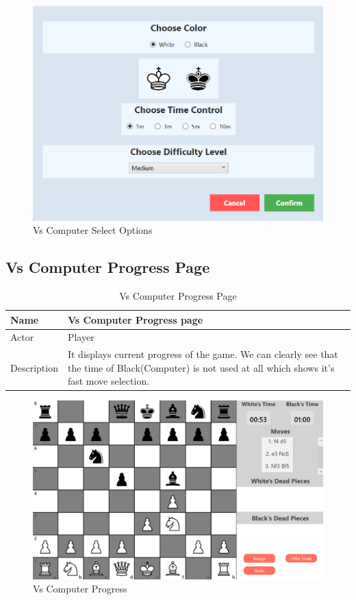 \documentclass[a4paper,12pt]{article}
\begin{document}
\begin{figure}[H]
    \centering
    \includegraphics[width=0.7\linewidth]{Images/Use Cases/vsComputerSelectOptions.png}
    \caption{Vs Computer Select Options}
    \label{fig:vsComputerSelectOptions}
\end{figure}
    
\subsection{Vs Computer Progress Page}

\begin{longtable}{|m{}|m{}|}
    \caption{Vs Computer Progress Page} \\
    \hline
    Name & Vs Computer Progress page \\
    \hline
    Actor & Player \\
    \hline
    Description & It displays current progress of the game. We can clearly see that the time of Black(Computer) is not used at all which shows it's fast move selection. \\ 
    \hline
\end{longtable}

\begin{figure}[H]
    \centering
    \includegraphics[width=0.7\linewidth]{Images/Use Cases/vsComputerProgress.png}
    \caption{Vs Computer Progress}
    \label{fig:vsComputerProgress}
\end{figure}
    
\end{document}
